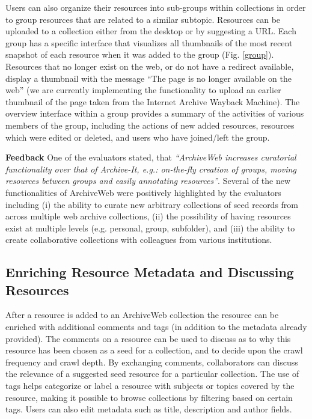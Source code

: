 \documentclass{llncs}
\begin{document}
Users can also organize their resources into sub-groups within
collections in order to group resources that are related to a similar
subtopic. Resources can be uploaded to a collection either from the
desktop or by suggesting a URL. Each group has a specific interface
that visualizes all thumbnails of the most recent snapshot of each
resource when it was added to the group (Fig. \ref{group}). Resources
that no longer exist on the web, or do not have a redirect available,
display a thumbnail with the message ``The page is no longer available
on the web'' (we are currently implementing the functionality to
upload an earlier thumbnail of the page taken from the Internet
Archive Wayback Machine). The overview interface within a group
provides a summary of the activities of various members of the group,
including the actions of new added resources, resources which were
edited or deleted, and users who have joined/left the group.

\textbf{Feedback} One of the evaluators stated, that
\textit{``ArchiveWeb increases curatorial functionality over that of
  Archive-It, e.g.: on-the-fly creation of groups, moving resources
  between groups and easily annotating resources''}. Several of the
new functionalities of ArchiveWeb were positively highlighted by the
evaluators including (i) the ability to curate new arbitrary collections
of seed records from across multiple web archive collections, (ii) the
possibility of having resources exist at multiple levels (e.g. personal, group,
subfolder), and (iii) the ability to create collaborative
collections with colleagues from various institutions.

\subsection{Enriching Resource Metadata and Discussing Resources}\label{sec:enriching}

After a resource is added to an ArchiveWeb collection the resource
can be enriched with additional comments and tags (in addition to the
metadata already provided). The comments on a resource can be used to
discuss as to why this resource has been chosen as a seed for a
collection, and to decide upon the crawl frequency and crawl depth. By
exchanging comments, collaborators can discuss the relevance of a
suggested seed resource for a particular collection. The use of tags
helps categorize or label a resource with subjects or topics
covered by the resource, making it possible to browse collections by
filtering based on certain tags. Users can also edit metadata such as title, description and author fields.
\end{document}
